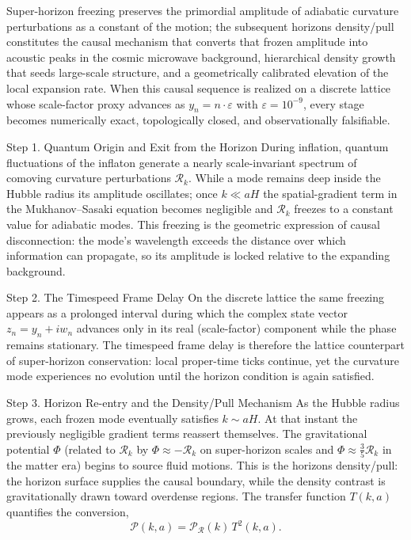 Super-horizon freezing preserves the primordial amplitude of adiabatic curvature perturbations as a constant of the motion; the subsequent horizons density/pull constitutes the causal mechanism that converts that frozen amplitude into acoustic peaks in the cosmic microwave background, hierarchical density growth that seeds large-scale structure, and a geometrically calibrated elevation of the local expansion rate. When this causal sequence is realized on a discrete lattice whose scale-factor proxy advances as \(y_n=n\cdot\varepsilon\) with \(\varepsilon=10^{-9}\), every stage becomes numerically exact, topologically closed, and observationally falsifiable.

Step 1. Quantum Origin and Exit from the Horizon  
During inflation, quantum fluctuations of the inflaton generate a nearly scale-invariant spectrum of comoving curvature perturbations \(\mathcal{R}_k\). While a mode remains deep inside the Hubble radius its amplitude oscillates; once \(k\ll aH\) the spatial-gradient term in the Mukhanov–Sasaki equation becomes negligible and \(\mathcal{R}_k\) freezes to a constant value for adiabatic modes. This freezing is the geometric expression of causal disconnection: the mode’s wavelength exceeds the distance over which information can propagate, so its amplitude is locked relative to the expanding background.

Step 2. The Timespeed Frame Delay  
On the discrete lattice the same freezing appears as a prolonged interval during which the complex state vector \(z_n=y_n+iw_n\) advances only in its real (scale-factor) component while the phase remains stationary. The timespeed frame delay is therefore the lattice counterpart of super-horizon conservation: local proper-time ticks continue, yet the curvature mode experiences no evolution until the horizon condition is again satisfied.

Step 3. Horizon Re-entry and the Density/Pull Mechanism  
As the Hubble radius grows, each frozen mode eventually satisfies \(k\sim aH\). At that instant the previously negligible gradient terms reassert themselves. The gravitational potential \(\Phi\) (related to \(\mathcal{R}_k\) by \(\Phi\approx-\mathcal{R}_k\) on super-horizon scales and \(\Phi\approx\frac35\mathcal{R}_k\) in the matter era) begins to source fluid motions. This is the horizons density/pull: the horizon surface supplies the causal boundary, while the density contrast is gravitationally drawn toward overdense regions. The transfer function \(T(k,a)\) quantifies the conversion,
\[
\mathcal{P}(k,a)=\mathcal{P}_\mathcal{R}(k)\,T^2(k,a).
\]

